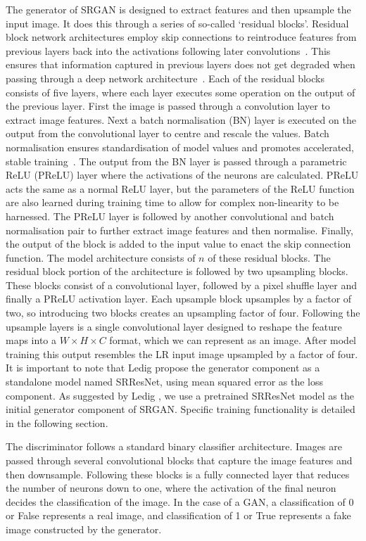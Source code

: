 The generator of SRGAN is designed to extract features and then upsample the input image. It does this through a series of so-called `residual blocks'. Residual block network architectures employ skip connections to reintroduce features from previous layers back into the activations following later convolutions~\cite{residualNets}. This ensures that information captured in previous layers does not get degraded when passing through a deep network architecture~\cite{residualNets}. Each of the residual blocks consists of five layers, where each layer executes some operation on the output of the previous layer. First the image is passed through a convolution layer to extract image features. Next a batch normalisation (BN) layer is executed on the output from the convolutional layer to centre and rescale the values. Batch normalisation ensures standardisation of model values and promotes accelerated, stable training~\cite{batchNorm}. The output from the BN layer is passed through a parametric ReLU (PReLU) layer where the activations of the neurons are calculated. PReLU acts the same as a normal ReLU layer, but the parameters of the ReLU function are also learned during training time to allow for complex non-linearity to be harnessed. The PReLU layer is followed by another convolutional and batch normalisation pair to further extract image features and then normalise. Finally, the output of the block is added to the input value to enact the skip connection function. The model architecture consists of $n$ of these residual blocks. The residual block portion of the architecture is followed by two upsampling blocks. These blocks consist of a convolutional layer, followed by a pixel shuffle layer and finally a PReLU activation layer. Each upsample block upsamples by a factor of two, so introducing two blocks creates an upsampling factor of four. Following the upsample layers is a single convolutional layer designed to reshape the feature maps into a $W \times H \times C$ format, which we can represent as an image. After model training this output resembles the LR input image upsampled by a factor of four. It is important to note that Ledig \etal propose the generator component as a standalone model named SRResNet, using mean squared error as the loss component. As suggested by Ledig \etal , we use a pretrained SRResNet model as the initial generator component of SRGAN. Specific training functionality is detailed in the following section.

The discriminator follows a standard binary classifier architecture. Images are passed through several convolutional blocks that capture the image features and then downsample. Following these blocks is a fully connected layer that reduces the number of neurons down to one, where the activation of the final neuron decides the classification of the image. In the case of a GAN, a classification of 0 or False represents a real image, and classification of 1 or True represents a fake image constructed by the generator. 

